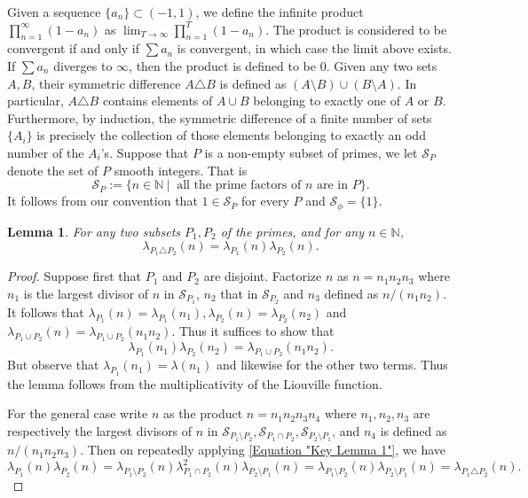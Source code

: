 \documentclass[12pt, a4paper]{amsart}
\newtheorem{lemma}{Lemma}
\theoremstyle{remark}
\theoremstyle{proof}
\numberwithin{equation}{section}
\numberwithin{assumption}{section}
\newcommand{\N}{\mathbb{N}}
\begin{document}
	Given a sequence $\{a_n\}\subset (-1,1)$, we define the infinite product $\prod_{n=1}^{\infty}(1-a_n)$ as $\lim_{T\to\infty} \prod_{n=1}^{T}(1-a_n)$. The product is considered to be convergent if and only if $\sum a_n$ is convergent, in which case the limit above exists. If $\sum a_n$ diverges to $\infty$, then the product is defined to be $0$. Given any two sets $A,B$,  their symmetric difference $A\triangle B$ is defined as $(A\setminus B)\cup (B\setminus A)$. In particular, $A\triangle B$ contains elements of $A\cup B$ belonging to exactly one of $A$ or $B$. Furthermore, by induction, the symmetric difference of a finite number of sets $\{A_i\}$ is precisely the collection of those elements belonging to exactly an odd number of the $A_i$'s. 	Suppose that $ P $ is a non-empty subset of primes, we let $ \mathcal{S}_P $ denote the set of $ P $ smooth integers. That is
	\[
	\mathcal{S}_P := \{n\in \N\ |\ \mbox{ all the prime factors of }n\mbox{ are in }P\}.
	\]
	It follows from our convention that $1\in \mathcal{S}_P$ for every $P$ and $\mathcal{S}_\phi = \{1\}$.
	\begin{lemma}\label{Lemma "Key lemma"}
		For any two subsets $P_1, P_2$ of the primes, and for any $n\in \N$,
		\[
		\lambda_{P_1\triangle P_2}(n) = \lambda_{P_1}(n)\lambda_{P_2}(n).
		\]
	\end{lemma}
	
	\begin{proof}
		Suppose first that $P_1$ and $P_2$ are disjoint. Factorize $ n $ as $ n = n_1n_2n_3 $ where $ n_1$ is the largest divisor of $n$ in  $\mathcal{S}_{P_1}$, $n_2$ that in $\mathcal{S}_{P_2} $ and $ n_3 $ defined as $ n/(n_1n_2) $. It follows that $ \lambda_{P_1}(n) = \lambda_{P_1} (n_1), \lambda_{P_2}(n) = \lambda_{P_2}(n_2) $ and $ \lambda_{P_1\cup P_2}(n) = \lambda_{P_1\cup P_2}(n_1n_2) $. Thus it suffices to show that 
		\begin{equation}\label{Equation "Key Lemma 1"}
			\lambda_{P_1}(n_1)\lambda_{P_2}(n_2) = \lambda_{P_1\cup P_2}(n_1n_2).
		\end{equation}
		But observe that $ \lambda_{P_1}(n_1) = \lambda(n_1) $ and likewise for the other two terms. Thus the lemma follows from the multiplicativity of the Liouville function.
				
		For the general case write $ n $ as the product $ n = n_1n_2n_3n_4 $ where $ n_1, n_2,n_3 $ are respectively the largest divisors of $n$ in $ \mathcal{S}_{P_1\setminus P_2}, \mathcal{S}_{P_1\cap P_2}, \mathcal{S}_{P_2\setminus P_1} $, and $ n_4 $ is defined as $ n/(n_1n_2n_3) $. Then on repeatedly applying \eqref{Equation "Key Lemma 1"}, we have
		\[
			\lambda_{P_1}(n)\lambda_{P_2}(n) = \lambda_{P_1\setminus P_2}(n) \lambda^2_{P_1\cap P_2}(n) \lambda_{P_2\setminus P_1}(n)
		= \lambda_{P_1\setminus P_2}(n) \lambda_{P_2\setminus P_1}(n)
		= \lambda_{P_1\triangle P_2}(n).
		\]
	\end{proof}
	
\end{document}
